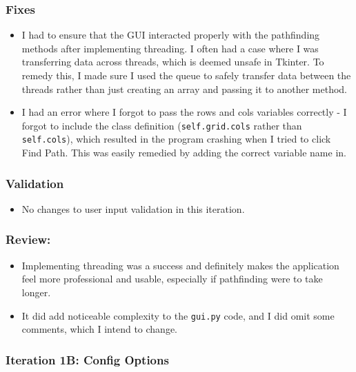 \subsubsection{Fixes}
\begin{itemize}
	\item I had to ensure that the GUI interacted properly with the pathfinding methods after implementing threading. I often had a case where I was transferring data across threads, which is deemed unsafe in Tkinter. To remedy this, I made sure I used the queue to safely transfer data between the threads rather than just creating an array and passing it to another method.
	
	\item I had an error where I forgot to pass the rows and cols variables correctly - I forgot to include the class definition (\verb|self.grid.cols| rather than \verb|self.cols|), which resulted in the program crashing when I tried to click Find Path. This was easily remedied by adding the correct variable name in.
\end{itemize}

\subsubsection{Validation}
\begin{itemize}
	\item No changes to user input validation in this iteration.
\end{itemize}

\subsubsection{Review:}
\begin{itemize}
	\item Implementing threading was a success and definitely makes the application feel more professional and usable, especially if pathfinding were to take longer.
	\item It did add noticeable complexity to the \verb|gui.py| code, and I did omit some comments, which I intend to change.
\end{itemize}

\newpage

\subsubsection{Iteration 1B: Config Options}

